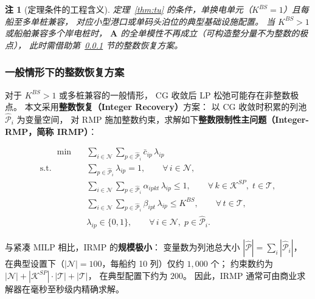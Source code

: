 \documentclass[UTF8, a4paper, 12pt]{ctexart}
\newtheorem{remark}{注}
\begin{document}
\begin{remark}[定理条件的工程含义]
定理~\ref{thm:tu} 的条件，单换电单元（$K^{BS}=1$）且每船至多单桩兼容，
对应小型港口或单码头泊位的典型基础设施配置。
当 $K^{BS}>1$ 或船舶兼容多个岸电桩时，
$\mathbf{A}$ 的全单模性不再成立（可构造整分量不为整数的极点），
此时需借助第~\ref{sec:cg_ir} 节的整数恢复方案。
\end{remark}

\subsubsection{一般情形下的整数恢复方案}
\label{sec:cg_ir}

对于 $K^{BS}>1$ 或多桩兼容的一般情形，
CG 收敛后 LP 松弛可能存在非整数极点。
本文采用\textbf{整数恢复（Integer Recovery）}方案：
以 CG 收敛时积累的列池 $\hat{\mathcal{P}}_i$ 为变量空间，
对 RMP 施加整数约束，求解如下\textbf{整数限制性主问题（Integer-RMP，简称 IRMP）}：

\begin{align}
  [\text{IRMP}] \qquad
  \min \quad & \sum_{i \in \mathcal{N}} \sum_{p \in \hat{\mathcal{P}}_i}
    \bar{c}_{ip}\, \lambda_{ip}
  \label{eq:irmp_obj} \\
  \text{s.t.} \quad
  & \sum_{p \in \hat{\mathcal{P}}_i} \lambda_{ip} = 1,
    \qquad \forall\, i \in \mathcal{N},
  \label{eq:irmp_convex} \\
  & \sum_{i \in \mathcal{N}} \sum_{p \in \hat{\mathcal{P}}_i}
    \alpha_{ipkt}\, \lambda_{ip} \le 1,
    \qquad \forall\, k \in \mathcal{K}^{SP},\; t \in \mathcal{T},
  \label{eq:irmp_sp} \\
  & \sum_{i \in \mathcal{N}} \sum_{p \in \hat{\mathcal{P}}_i}
    \beta_{ipt}\, \lambda_{ip} \le K^{BS},
    \qquad \forall\, t \in \mathcal{T},
  \label{eq:irmp_bs} \\
  & \lambda_{ip} \in \{0,1\},
    \qquad \forall\, i \in \mathcal{N},\; p \in \hat{\mathcal{P}}_i.
  \label{eq:irmp_int}
\end{align}

与紧凑 MILP 相比，IRMP 的\textbf{规模极小}：
变量数为列池总大小 $|\hat{\mathcal{P}}|=\sum_i|\hat{\mathcal{P}}_i|$，
在典型设置下（$|\mathcal{N}|=100$，每船约 10 列）仅约 $1{,}000$ 个；
约束数约为 $|\mathcal{N}|+|\mathcal{K}^{SP}|\cdot|\mathcal{T}|+|\mathcal{T}|$，
在典型配置下约为 $200$。
因此，IRMP 通常可由商业求解器在毫秒至秒级内精确求解。
\end{document}
